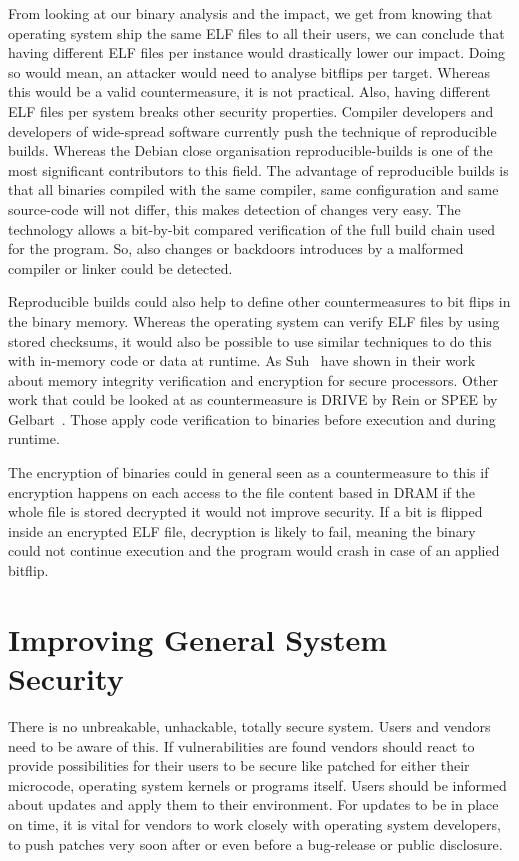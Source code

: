 From looking at our binary analysis and the impact, we get from knowing that
operating system ship the same ELF files to all their users, we can conclude
that having different ELF files per instance would drastically lower our impact.
Doing so would mean, an attacker would need to analyse bitflips per target.
Whereas this would be a valid countermeasure, it is not practical. Also, having
different ELF files per system breaks other security properties. Compiler
developers and developers of wide-spread software currently push the technique
of reproducible builds. Whereas the Debian close organisation
reproducible-builds\cite{reprobuilds} is one of the most significant
contributors to this field. The advantage of reproducible builds is that all
binaries compiled with the same compiler, same configuration and same
source-code will not differ, this makes detection of changes very easy. The
technology allows a bit-by-bit compared verification of the full build chain
used for the program. So, also changes or backdoors introduces by a malformed
compiler or linker could be detected.

Reproducible builds could also help to define other countermeasures to bit flips
in the binary memory. Whereas the operating system can verify ELF files by using
stored checksums, it would also be possible to use similar techniques to do this
with in-memory code or data at runtime. As Suh~\etal\cite{memintegrity} have
shown in their work about memory integrity verification and encryption for
secure processors. Other work that could be looked at as countermeasure is
DRIVE\cite{drive} by Rein or SPEE\cite{spee} by Gelbart~\etal. Those apply
code verification to binaries before execution and during runtime.

The encryption of binaries could in general seen as a countermeasure to this if
encryption happens on each access to the file content based in DRAM if the whole
file is stored decrypted it would not improve security. If a bit is flipped
inside an encrypted ELF file, decryption is likely to fail, meaning the binary
could not continue execution and the program would crash in case of an applied
bitflip.

\section{Improving General System Security}

There is no unbreakable, unhackable, totally secure system. Users and vendors
need to be aware of this. If vulnerabilities are found vendors should react to
provide possibilities for their users to be secure like patched for either their
microcode, operating system kernels or programs itself. Users should be informed
about updates and apply them to their environment. For updates to be in place on
time, it is vital for vendors to work closely with operating system developers,
to push patches very soon after or even before a bug-release or public
disclosure.


